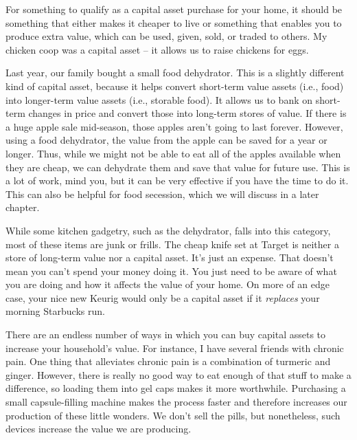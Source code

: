 \documentclass[letterpaper]{article}
\begin{document}
{\color{black}
For something to qualify as a capital asset purchase for your home, it
should be something that either makes it cheaper to live or something
that enables you to produce extra value, which can be used, given,
sold, or traded to others. My chicken coop was a capital asset – it
allows us to raise chickens for eggs. }

{\color{black}
Last year, our family bought a small food dehydrator. This is a slightly
different kind of capital asset, because it helps convert short-term
value assets (i.e., food) into longer-term value assets (i.e., storable
food). It allows us to bank on short-term changes in price and convert
those into long-term stores of value. If there is a huge apple sale
mid-season, those apples aren’t going to last forever. However, using a
food dehydrator, the value from the apple can be saved for a year or
longer. Thus, while we might not be able to eat all of the apples
available when they are cheap, we can dehydrate them and save that
value for future use. This is a lot of work, mind you, but it can be
very effective if you have the time to do it. This can also be helpful
for food secession, which we will discuss in a later chapter.}

{\color{black}
While some kitchen
gadgetry\textcolor[rgb]{0.32941177,0.5529412,0.83137256}{, such as the
dehydrator,} falls into this category, most of these items are junk or
frills. The cheap knife set at Target is neither a store of long-term
value nor a capital asset. It’s just an expense. That doesn’t mean you
can’t spend your money doing it. You just need to be aware of what you
are doing and how it affects the value of your home. On more of an edge
case, your nice new Keurig would only be a capital asset if it
\textit{replaces} your morning Starbucks run.}

{\color{black}
\textcolor[rgb]{0.32941177,0.5529412,0.83137256}{The}re are an endless
number of ways in which you can buy capital assets to increase your
household’s value. For instance, I have several friends with chronic
pain. One thing that alleviates chronic pain is a combination of
turmeric and ginger. However, there is really no good way to eat enough
of that stuff to make a difference, so loading them into gel caps makes
it more worthwhile. Purchasing a small capsule-filling machine makes
the process faster and therefore increases our production of these
little wonders. We don’t sell the pills, but nonetheless, such devices
increase the value we are producing.}
\end{document}
